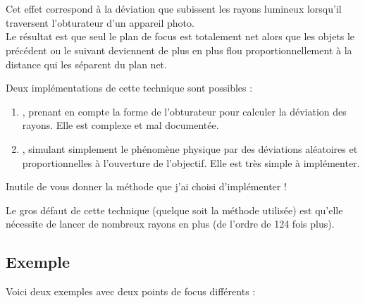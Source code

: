 \section{\label{sec:dof}}
Cet effet correspond à la déviation que subissent les rayons lumineux
lorsqu'il traversent l'obturateur d'un appareil photo.\\

Le résultat est que seul le plan de focus est totalement net alors que les
objets le précédent ou le suivant deviennent de plus en plus flou
proportionnellement à la distance qui les séparent du plan net.

Deux implémentations de cette technique sont possibles :
\begin{enumerate}
  \item {}, prenant en compte la forme de l'obturateur
    pour calculer la déviation des rayons. Elle est complexe et mal
    documentée.
  \item {}, simulant simplement le phénomène
    physique par des déviations aléatoires et proportionnelles à l'ouverture
    de l'objectif. Elle est très simple à implémenter.
\end{enumerate}

Inutile de vous donner la méthode que j'ai choisi d'implémenter !

Le gros défaut de cette technique (quelque soit la méthode utilisée) est
qu'elle nécessite de lancer de nombreux rayons en plus (de l'ordre de 124 fois
plus).

\subsection{Exemple}
Voici deux exemples avec deux points de focus différents :

